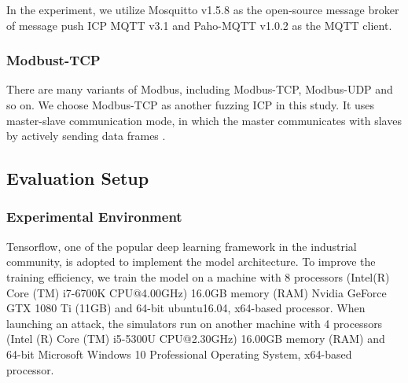 In the experiment, we utilize Mosquitto v1.5.8 \cite{light2017mosquitto} as the open-source message broker of message push ICP MQTT v3.1 and  Paho-MQTT v1.0.2 \cite{light2017mosquitto} as the MQTT client. 

\subsubsection{Modbust-TCP}
There are many variants of Modbus, including Modbus-TCP, Modbus-UDP and so on. We choose Modbus-TCP as another fuzzing ICP in this study. It uses master-slave communication mode, in which the master communicates with slaves by actively sending data frames \cite{swales1999open}. 

\subsection{Evaluation Setup}
\subsubsection{Experimental Environment}
Tensorflow, one of the popular deep learning framework in the industrial community, is adopted to implement the model architecture. To improve the training efficiency, we train the model on a machine with 8 processors (Intel(R) Core (TM) i7-6700K CPU@4.00GHz)  16.0GB memory (RAM) Nvidia GeForce GTX 1080 Ti (11GB) and 64-bit ubuntu16.04, x64-based processor. When launching an attack, the simulators run on another machine with 4 processors (Intel (R) Core (TM) i5-5300U CPU@2.30GHz) 16.00GB memory (RAM) and 64-bit Microsoft Windows 10 Professional Operating System, x64-based processor.

